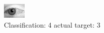 \begin{figure}[h!]
\begin{center}
\includegraphics[width=0.60\columnwidth]{figures/ID2857_class_4_target_3.png}
\end{center}
\caption{ Classification: 4 actual target: 3}
\label{fig:ID2857_class_4_target_3}
\end{figure}
